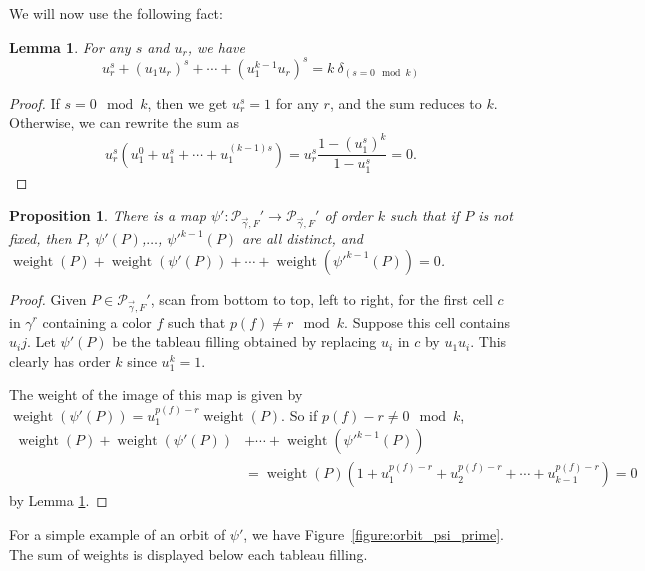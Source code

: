 \documentclass[a4paper,12pt]{amsart}
\theoremstyle{plain}
\newtheorem{lemma}[theorem]{Lemma}
\newtheorem{proposition}[theorem]{Proposition}
\theoremstyle{definition}
\theoremstyle{remark}
\DeclareMathOperator{\weight}{weight}
\begin{document}
We will now use the following fact:
\begin{lemma} \label{lemma:sumofroots}
For any $s$ and $u_r$, we have
\begin{equation*}
u_r^s + (u_1 u_r)^s + \cdots + (u_1^{k-1} u_r)^s = k ~\delta_{(s = 0 \mod k)}
\end{equation*}
\end{lemma}
\begin{proof} 
If $s = 0 \mod k$, then we get $u_r^s =1$ for any $r$, and the sum reduces to $k$. Otherwise, we can rewrite the sum as 
\begin{equation*}
u_r^s (u_1^0+u_1^s+\cdots+u_1^{(k-1)s} ) = u_r^s \frac{1-(u_1^{s})^{k}}{1-u_1^s} = 0.
\end{equation*}
\end{proof}

\begin{proposition}
There is a map $\psi':\mathcal{P}_{\vec{\gamma},F}' \rightarrow \mathcal{P}_{\vec{\gamma},F}'$ of order $k$ such that if $P$ is not fixed, then 
$P$, $\psi'(P)$,$\dots$, ${\psi'}^{k-1}(P)$ are all distinct, and
$\weight(P)+\weight(\psi'(P))+\cdots + \weight({\psi'}^{k-1}(P)) = 0$.
\end{proposition}
\begin{proof}
Given $P \in \mathcal{P}_{\vec{\gamma},F}'$, scan from bottom to top, left to right, for the first cell $c$ in $\gamma^r$ containing a color $f$ such that $p(f) \neq r \mod k$. Suppose this cell contains $u_i j$. Let $\psi'(P)$ be the tableau filling obtained by replacing $u_i$ in $c$ by $u_1 u_i$. This clearly has order $k$ since $u_1^k = 1$.

The weight of the image of this map is given by $\weight(\psi'(P)) = u_1^{p(f)-r} \weight(P)$. So if $p(f)-r \neq 0 \mod k$, 
\begin{align*}
\weight(P)+\weight(\psi'(P))&+\cdots + \weight({\psi'}^{k-1}(P)) \\ & = \weight(P)( 
1+ u_1^{p(f)-r} + u_2^{p(f)-r}+\cdots + u_{k-1}^{p(f)-r}) = 0
\end{align*}
by Lemma \ref{lemma:sumofroots}.
\end{proof}
For a simple example of an orbit of $\psi'$, we have Figure~\ref{figure:orbit_psi_prime}. The sum of weights is displayed below each tableau filling.
\end{document}
